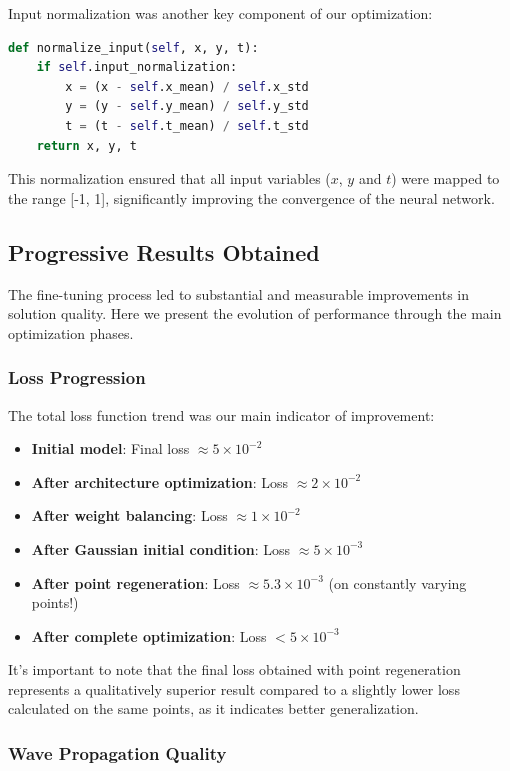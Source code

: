 Input normalization was another key component of our optimization:
\begin{lstlisting}[language=Python]
def normalize_input(self, x, y, t):
    if self.input_normalization:
        x = (x - self.x_mean) / self.x_std
        y = (y - self.y_mean) / self.y_std
        t = (t - self.t_mean) / self.t_std
    return x, y, t
\end{lstlisting}

This normalization ensured that all input variables ($x$, $y$ and $t$) were mapped to the range [-1, 1], significantly improving the convergence of the neural network.

\subsection{Progressive Results Obtained}

The fine-tuning process led to substantial and measurable improvements in solution quality. Here we present the evolution of performance through the main optimization phases.

\subsubsection*{Loss Progression}

The total loss function trend was our main indicator of improvement:
\begin{itemize}
    \item \textbf{Initial model}: Final loss $\approx 5 \times 10^{-2}$
    \item \textbf{After architecture optimization}: Loss $\approx 2 \times 10^{-2}$
    \item \textbf{After weight balancing}: Loss $\approx 1 \times 10^{-2}$
    \item \textbf{After Gaussian initial condition}: Loss $\approx 5 \times 10^{-3}$
    \item \textbf{After point regeneration}: Loss $\approx 5.3 \times 10^{-3}$ (on constantly varying points!)
    \item \textbf{After complete optimization}: Loss $< 5 \times 10^{-3}$
\end{itemize}

It's important to note that the final loss obtained with point regeneration represents a qualitatively superior result compared to a slightly lower loss calculated on the same points, as it indicates better generalization.

\subsubsection*{Wave Propagation Quality}

